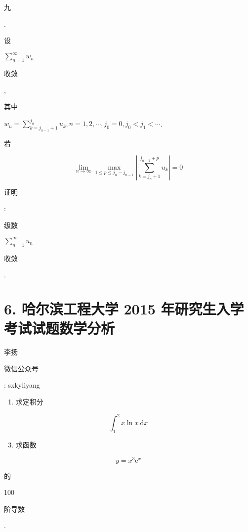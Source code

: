 \documentclass[10pt]{article}
\begin{document}
\begin{CJK}{UTF8}{mj}九\end{CJK}. \begin{CJK}{UTF8}{mj}设\end{CJK} $\sum_{n=1}^{\infty} w_{n}$ \begin{CJK}{UTF8}{mj}收敛\end{CJK}, \begin{CJK}{UTF8}{mj}其中\end{CJK} $w_{n}=\sum_{k=j_{n-1}+1}^{j_{n}} u_{k}, n=1,2, \cdots, j_{0}=0, j_{0}<j_{1}<\cdots$. \begin{CJK}{UTF8}{mj}若\end{CJK}
$$
\lim _{n \rightarrow \infty} \max _{1 \leq p \leq j_{n}-j_{n-1}}\left|\sum_{k=j_{n}+1}^{j_{n-1}+p} u_{k}\right|=0
$$
\begin{CJK}{UTF8}{mj}证明\end{CJK}: \begin{CJK}{UTF8}{mj}级数\end{CJK} $\sum_{n=1}^{\infty} u_{n}$ \begin{CJK}{UTF8}{mj}收敛\end{CJK}.

\section{6. 哈尔滨工程大学 2015 年研究生入学考试试题数学分析}
\begin{CJK}{UTF8}{mj}李扬\end{CJK}

\begin{CJK}{UTF8}{mj}微信公众号\end{CJK}: sxkyliyang

\begin{enumerate}
  \item \begin{CJK}{UTF8}{mj}求定积分\end{CJK}
\end{enumerate}
$$
\int_{1}^{2} x \ln x \mathrm{~d} x
$$

\begin{enumerate}
  \setcounter{enumi}{2}
  \item \begin{CJK}{UTF8}{mj}求函数\end{CJK}
\end{enumerate}
$$
y=x^{3} \mathrm{e}^{x}
$$
\begin{CJK}{UTF8}{mj}的\end{CJK} 100 \begin{CJK}{UTF8}{mj}阶导数\end{CJK}.
\end{document}
